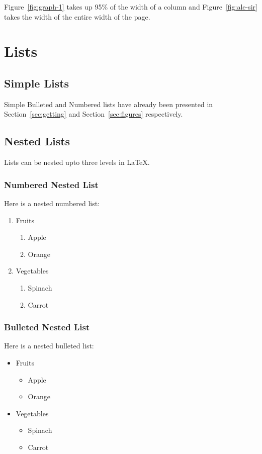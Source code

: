\documentclass[fleqn, 10pt, twoside, blindreview]{IOEGC}
\begin{document}
Figure~\ref{fig:graph-1} takes up 95\% of the width of a column and 
Figure~\ref{fig:ale-sir} takes the width of the entire width of the page.


\section{Lists} \label{sec:lists}

\subsection{Simple Lists}
Simple Bulleted and Numbered lists have already been presented in 
Section~\ref{sec:getting} and Section~\ref{sec:figures} respectively.

\subsection{Nested Lists}
Lists can be nested upto three levels in \LaTeX.

\subsubsection{Numbered Nested List}
Here is a nested numbered list:

\begin{enumerate}
  \item Fruits
    \begin{enumerate}
      \item Apple
      \item Orange
    \end{enumerate}
  \item Vegetables
    \begin{enumerate}
      \item Spinach
      \item Carrot
    \end{enumerate}
\end{enumerate}

\subsubsection{Bulleted Nested List}
Here is a nested bulleted list:

\begin{itemize}[noitemsep] 
  \item Fruits
    \begin{itemize}[noitemsep] 
      \item Apple
      \item Orange
    \end{itemize}
  \item Vegetables
    \begin{itemize}[noitemsep] 
      \item Spinach
      \item Carrot
    \end{itemize}
\end{itemize}
\end{document}
